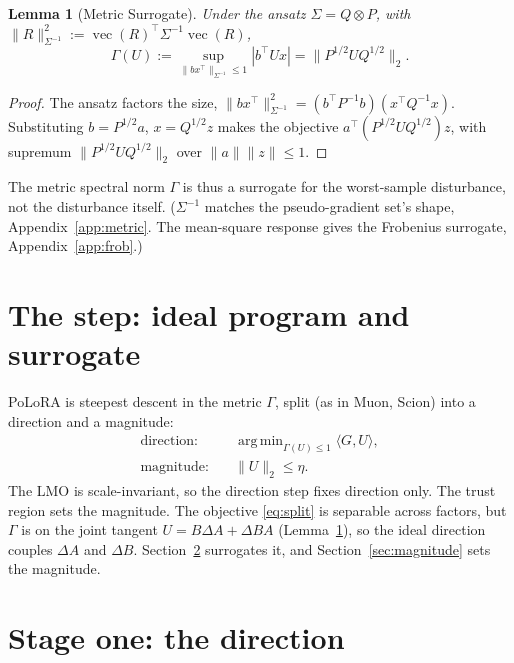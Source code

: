 \documentclass[11pt]{article}
\DeclarePairedDelimiter{\norm}{\lVert}{\rVert}
\DeclareMathOperator{\vecop}{vec}
\DeclareMathOperator*{\argmin}{arg\,min}
\newcommand{\norm}[1]{\| #1\|}
\newtheorem{lemma}[proposition]{Lemma}
\begin{document}
\begin{lemma}[Metric Surrogate]
\label{lem:surrogate}
Under the ansatz $\Sigma=Q\otimes P$, with
$\norm{R}_{\Sigma^{-1}}^2:=\vecop(R)^\top\Sigma^{-1}\vecop(R)$,
\begin{equation}
  \Gamma(U):=\sup_{\norm{bx^\top}_{\Sigma^{-1}}\le1}|b^\top Ux|
  =\norm{P^{1/2}UQ^{1/2}}_2 .
  \label{eq:gamma-spectral}
\end{equation}
\end{lemma}

\begin{proof}
The ansatz factors the size,
$\norm{bx^\top}_{\Sigma^{-1}}^2=(b^\top P^{-1}b)(x^\top Q^{-1}x)$. Substituting
$b=P^{1/2}a$, $x=Q^{1/2}z$ makes the objective $a^\top(P^{1/2}UQ^{1/2})z$, with
supremum $\norm{P^{1/2}UQ^{1/2}}_2$ over $\norm{a}\norm{z}\le1$.
\end{proof}

The metric spectral norm $\Gamma$ is thus a surrogate for the worst-sample
disturbance, not the disturbance itself. ($\Sigma^{-1}$ matches the
pseudo-gradient set's shape, Appendix~\ref{app:metric}. The mean-square response
gives the Frobenius surrogate, Appendix~\ref{app:frob}.)

\section{The step: ideal program and surrogate}
\label{sec:program}

PoLoRA is steepest descent in the metric $\Gamma$, split (as in Muon, Scion) into
a direction and a magnitude:
\begin{align}
  \text{direction:}\quad &\argmin_{\Gamma(U)\le1}\langle G,U\rangle,
    \label{eq:ideal}\\
  \text{magnitude:}\quad &\norm{U}_2\le\eta . \nonumber
\end{align}
The LMO is scale-invariant, so the direction step fixes direction only. The trust
region sets the magnitude. The objective \eqref{eq:split} is separable across
factors, but $\Gamma$ is on the joint tangent $U=B\Delta A+\Delta B A$
(Lemma~\ref{lem:surrogate}), so the ideal direction couples $\Delta A$ and
$\Delta B$. Section~\ref{sec:direction} surrogates it, and
Section~\ref{sec:magnitude} sets the magnitude.

\section{Stage one: the direction}
\label{sec:direction}
\end{document}
